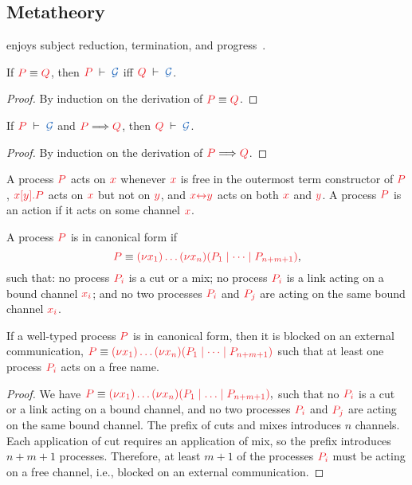 \documentclass[envcountsame,envcountsect,UKenglish]{llncs}
\begin{document}
\subsection{Metatheory}
\label{sec:hcp-metatheory}
\hcp enjoys subject reduction, termination, and progress~\citep{kokke2018tlla}.
\begin{lemma}\label{lem:hcp-preservation-equiv}
  If $\tm{P}\equiv\tm{Q}$, then $\seq[P]{\mathcal{G}}$ iff $\seq[Q]{\mathcal{G}}$.
\end{lemma} 
\begin{proof}
  By induction on the derivation of $\tm{P}\equiv\tm{Q}$.
\end{proof}
\begin{theorem}[Preservation]\label{thm:hcp-preservation}
  If $\seq[P]{\mathcal{G}}$ and $\reducesto{P}{Q}$, then $\seq[Q]{\mathcal{G}}$.
\end{theorem} 
\begin{proof}
  By induction on the derivation of $\reducesto{P}{Q}$.
\end{proof}
\begin{definition}[Actions]
  A process $\tm{P}$ acts on $\tm{x}$ whenever $\tm{x}$ is free in the outermost
  term constructor of $\tm{P}$, \eg $\tm{\piSend{x}{y}{P}}$ acts on $\tm{x}$
  but not on $\tm{y}$, and $\tm{\cpLink{x}{y}}$ acts on both $\tm{x}$ and $\tm{y}$.
  A process $\tm{P}$ is an action if it acts on some channel $\tm{x}$.
\end{definition}
\begin{definition}\label{def:hcp-canonical-forms}
  A process $\tm{P}$ is in canonical form if
  \[
  \tm{P} \equiv \tm{\piNew{x_1}{\dots\piNew{x_n}{(P_1 \mid \dots \mid P_{n+m+1})}}},
  \]
  such that: no process $\tm{P_i}$ is a cut or a mix; no process $\tm{P_i}$ is a link acting on a bound channel $\tm{x_i}$; and no two processes $\tm{P_i}$ and $\tm{P_j}$ are acting on the same bound channel $\tm{x_i}$.
\end{definition}
\begin{lemma}
  If a well-typed process $\tm{P}$ is in canonical form, then it is blocked on
  an external communication, \ie
  $\tm{P}\equiv\tm{\piNew{x_1}{\dots\piNew{x_n}{(P_1\mid\dots\mid P_{n+m+1})}}}$
  such that at least one process $\tm{P_i}$ acts on a free name.
\end{lemma}
\begin{proof}
  We have
  \(
  \tm{P} \equiv \tm{\piNew{x_1}{\dots\piNew{x_n}{(P_1 \ppar \dots \ppar P_{n+m+1})}}},
  \)
  such that no $\tm{P_i}$ is a cut or a link acting on a bound channel, and no two processes $\tm{P_i}$ and $\tm{P_j}$ are acting on the same bound channel. The prefix of cuts and mixes introduces $n$ channels. Each application of cut requires an application of mix, so the prefix introduces $n+m+1$ processes. Therefore, at least $m+1$ of the processes $\tm{P_i}$ must be acting on a free channel, i.e., blocked on an external communication.
\end{proof}
\end{document}
